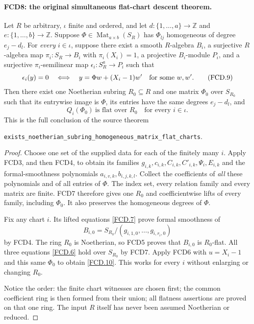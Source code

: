 \documentclass[11pt,a4paper]{article}
\numberwithin{equation}{section}
\theoremstyle{remark}\newtheorem{remark}[theorem]{Remark}
\begin{document}
\paragraph{FCD8: the original simultaneous flat-chart descent theorem.}
\label{claim:FCD8}
Let $R$ be arbitrary, $\iota$ finite and ordered, and let
$d:\{1,\ldots,a\}\to\mathbb Z$ and
$e:\{1,\ldots,b\}\to\mathbb Z$.  Suppose
$\Phi\in\operatorname{Mat}_{a\times b}(S_R)$ has
$\Phi_{lj}$ homogeneous of degree $e_j-d_l$.
For \emph{every} $i\in\iota$, suppose there exist a smooth
$R$-algebra $B_i$, a surjective $R$-algebra map $\pi_i:S_R\to B_i$
with $\pi_i(X_i)=1$, a projective $B_i$-module $P_i$, and a
surjective $\pi_i$-semilinear map $\epsilon_i:S_R^a\to P_i$
such that
\[
 \epsilon_i(y)=0
 \quad\Longleftrightarrow\quad
 y=\Phi w+(X_i-1)w'\quad\hbox{for some }w,w'.         \tag{FCD.9}\label{FCD.9}
\]
Then there exist one Noetherian subring $R_0\subseteq R$ and
one matrix $\Phi_0$ over $S_{R_0}$ such that its entrywise
image is $\Phi$, its entries have the same degrees $e_j-d_l$,
and
\[
 Q_i(\Phi_0)\ \text{is flat over }R_0
 \quad\text{for every }i\in\iota.                   \tag{FCD.10}\label{FCD.10}
\]
This is the full conclusion of the source theorem
\begin{center}
\texttt{exists\_\allowbreak{}noetherian\_\allowbreak{}subring\_\allowbreak{}}\allowbreak\texttt{homogeneous\_\allowbreak matrix\_\allowbreak flat\_\allowbreak charts}.
\end{center}

\begin{proof}
Choose one set of the supplied data for each of the finitely many
$i$.  Apply FCD3, and then FCD4, to obtain its families
$g_{i,k},c_{i,k},C_{i,k},C'_{i,k},\Psi_i,E_{i,k}$ and the
formal-smoothness polynomials $a_{i,v,k},b_{i,j,k,l}$.
Collect the coefficients of \emph{all} these polynomials and
of all entries of $\Phi$.  The index set, every relation family
and every matrix are finite.  FCD7 therefore gives one $R_0$
and coefficientwise lifts of every family, including $\Phi_0$.
It also preserves the homogeneous degrees of $\Phi$.

Fix any chart $i$.  Its lifted equations \eqref{FCD.7} prove
formal smoothness of
\[
 B_{i,0}=S_{R_0}/(g_{i,1,0},\ldots,g_{i,r_i,0})
\]
by FCD4.  The ring $R_0$ is Noetherian, so FCD5 proves that
$B_{i,0}$ is $R_0$-flat.  All three equations
\eqref{FCD.6} hold over $S_{R_0}$ by FCD7.  Apply FCD6 with
$u=X_i-1$ and this same $\Phi_0$ to obtain \eqref{FCD.10}.
This works for every $i$ without enlarging or changing $R_0$.

Notice the order: the finite chart witnesses are chosen first;
the common coefficient ring is then formed from their union;
all flatness assertions are proved on that one ring.  The input
$R$ itself has never been assumed Noetherian or reduced.
\end{proof}
\end{document}
